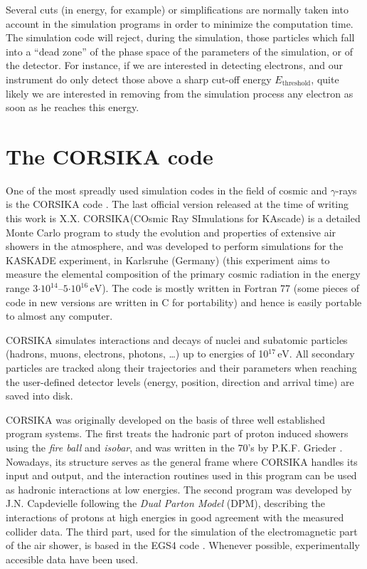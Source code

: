 \documentclass[12pt]{article}
\renewcommand{\u}[1]{\ensuremath{\mathrm{\,#1}}}
\def\lastCORSIKA{X.X\xspace}
\def\CORSIKA{\textsf{CORSIKA}\xspace}
\newcommand{\pow}[1]{\ensuremath{^{#1}}}        %
\newcommand{\E}[1]{\ensuremath{\cdot 10^{#1}}}  %
\begin{document}
\mcsimsample

Several cuts (in energy, for example) or simplifications are normally
taken into account in the simulation programs in order to minimize the
computation time. The simulation code will reject, during the
simulation, those particles which fall into a ``dead zone'' of the
phase space of the parameters of the simulation, or of the detector.
For instance, if we are interested in detecting electrons, and our
instrument do only detect those above a sharp cut-off energy
$E_{\mathrm{threshold}}$, quite likely we are interested in removing
from the simulation process any electron as soon as he reaches this
energy.

\section{The \CORSIKA code}
\label{sec:CORSIKA}
%
One of the most spreadly used simulation codes in the field of cosmic
and $\gamma$-rays is the \CORSIKA code \cite{CORSIKA:manual}. The last
official version released at the time of writing this work is
\lastCORSIKA.  \CORSIKA (COsmic Ray SImulations for KAscade) is a
detailed Monte Carlo program to study the evolution and properties of
extensive air showers in the atmosphere, and was developed to perform
simulations for the KASKADE experiment, in Karlsruhe (Germany)
\cite{KASKADE} (this experiment aims to measure the elemental
composition of the primary cosmic radiation in the energy range
$3\E{14}$--$5\E{16}$\u{eV}). The code is mostly written in Fortran 77
(some pieces of code in new versions are written in C for portability)
and hence is easily portable to almost any computer.

\CORSIKA simulates interactions and decays of nuclei and subatomic
particles (hadrons, muons, electrons, photons, \ldots) up to energies
of 10\pow{17}\u{eV}. All secondary particles are tracked along their
trajectories and their parameters when reaching the user-defined
detector levels (energy, position, direction and arrival time) are
saved into disk.

\CORSIKA was originally developed on the basis of three well
established program systems. The first treats the hadronic part of
proton induced showers using the \emph{fire ball} and \emph{isobar},
and was written in the 70's by P.K.F. Grieder \cite{Grieder:1979}.
Nowadays, its structure serves as the general frame where \CORSIKA
handles its input and output, and the interaction routines used in
this program can be used as hadronic interactions at low energies. The
second program was developed by J.N. Capdevielle
\cite{Capdevielle:1989} following the \emph{Dual Parton Model}
(DPM)\cite{Capella:1980}, describing the interactions of protons at
high energies in good agreement with the measured collider data. The
third part, used for the simulation of the electromagnetic part of the
air shower, is based in the EGS4 code \cite{EGS4}. Whenever possible,
experimentally accesible data have been used.
\end{document}
